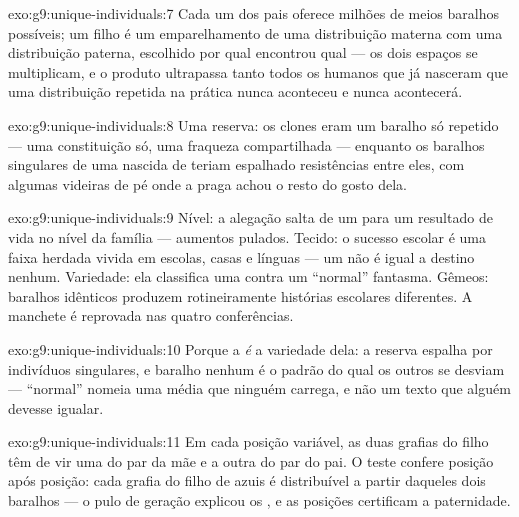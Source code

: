 \begin{solution}{exo:g9:unique-individuals:7}
Cada um dos pais oferece milhões de meios baralhos possíveis;
um filho é um emparelhamento de uma distribuição materna com
uma distribuição paterna, escolhido por qual  encontrou
qual --- os dois espaços se multiplicam, e o produto
ultrapassa tanto todos os humanos que já nasceram que uma
distribuição repetida na prática nunca aconteceu e nunca
acontecerá.
\end{solution}

\begin{solution}{exo:g9:unique-individuals:8}
Uma reserva: os clones eram um baralho só repetido --- uma
constituição só, uma fraqueza compartilhada --- enquanto os
baralhos singulares de uma  nascida de 
teriam espalhado resistências entre eles, com algumas
videiras de pé onde a praga achou o resto do gosto dela.
\end{solution}

\begin{solution}{exo:g9:unique-individuals:9}
Nível: a alegação salta de um  para um resultado de vida
no nível da família --- aumentos pulados. Tecido: o sucesso
escolar é uma faixa herdada vivida em escolas, casas e
línguas --- um  não é igual a destino nenhum. Variedade:
ela classifica uma  contra um ``normal'' fantasma.
Gêmeos: baralhos idênticos produzem rotineiramente histórias
escolares diferentes. A manchete é reprovada nas quatro
conferências.
\end{solution}

\begin{solution}{exo:g9:unique-individuals:10}
Porque a  \emph{é} a variedade dela: a reserva espalha
 por indivíduos singulares, e baralho nenhum é o padrão
do qual os outros se desviam --- ``normal'' nomeia uma média
que ninguém carrega, e não um texto que alguém devesse
igualar.
\end{solution}

\begin{solution}{exo:g9:unique-individuals:11}
Em cada posição variável, as duas grafias do filho têm de vir
uma do par da mãe e a outra do par do pai. O teste confere
posição após posição: cada grafia do filho de  azuis é
distribuível a partir daqueles dois baralhos --- o pulo de
geração explicou os , e as posições certificam a
paternidade.
\end{solution}

